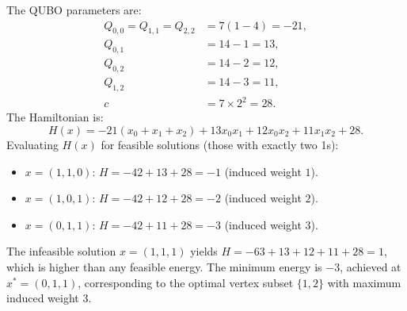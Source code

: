 \documentclass[12pt]{article}
\begin{document}
The QUBO parameters are:
\begin{align}
    Q_{0,0} = Q_{1,1} = Q_{2,2} &= 7(1 - 4) = -21, \\
    Q_{0,1} &= 14 - 1 = 13, \\
    Q_{0,2} &= 14 - 2 = 12, \\
    Q_{1,2} &= 14 - 3 = 11, \\
    c &= 7 \times 2^2 = 28.
\end{align}
The Hamiltonian is:
\begin{equation}
    H(x) = -21(x_0 + x_1 + x_2) + 13 x_0 x_1 + 12 x_0 x_2 + 11 x_1 x_2 + 28.
\end{equation}
Evaluating $H(x)$ for feasible solutions (those with exactly two 1s):
\begin{itemize}
    \item $x = (1,1,0)$: $H = -42 + 13 + 28 = -1$ (induced weight $1$).
    \item $x = (1,0,1)$: $H = -42 + 12 + 28 = -2$ (induced weight $2$).
    \item $x = (0,1,1)$: $H = -42 + 11 + 28 = -3$ (induced weight $3$).
\end{itemize}
The infeasible solution $x=(1,1,1)$ yields $H = -63 + 13 + 12 + 11 + 28 = 1$, which is higher than any feasible energy. The minimum energy is $-3$, achieved at $x^* = (0,1,1)$, corresponding to the optimal vertex subset $\{1,2\}$ with maximum induced weight $3$.
\end{document}
